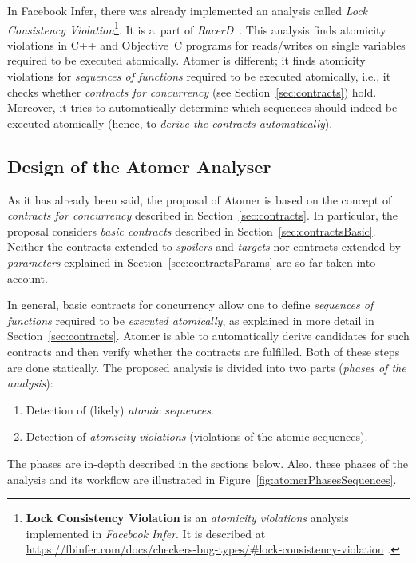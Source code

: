 In Facebook Infer, there was already implemented an analysis called \emph{Lock
Consistency Violation}\footnote{\textbf{Lock Consistency Violation} is an
\emph{atomicity violations} analysis implemented in \emph{Facebook Infer}. It
is described at
\url{https://fbinfer.com/docs/checkers-bug-types/\#lock-consistency-violation}%
.}. It is a~part of \emph{RacerD}~\cite{racerD, staticRaceDetectorTruePositives,
racerDOnline}. This analysis finds atomicity violations in C++ and Objective~C
programs for reads/writes on single variables required to be executed
atomically. Atomer is different; it finds atomicity violations for
\emph{sequences of functions} required to be executed atomically, i.e., it
checks whether \emph{contracts for concurrency}
(see Section~\ref{sec:contracts}) hold. Moreover, it tries to automatically
determine which sequences should indeed be executed atomically (hence, to
\emph{derive the contracts automatically}).

\subsection{Design of the Atomer Analyser}

As it has already been said, the proposal of Atomer is based on the concept
of \emph{contracts for concurrency} described in Section~\ref{sec:contracts}.
In particular, the proposal considers \emph{basic contracts} described in
Section~\ref{sec:contractsBasic}. Neither the contracts extended to
\emph{spoilers} and \emph{targets}
nor contracts extended by \emph{parameters} explained in
Section~\ref{sec:contractsParams} are so far taken into account.

In general, basic contracts for concurrency allow one to define \emph{sequences
of functions} required to be \emph{executed atomically}, as explained in more
detail in Section~\ref{sec:contracts}. Atomer is able to automatically derive
candidates for such contracts and then verify whether the contracts are
fulfilled. Both of these steps are done statically. The proposed analysis is
divided into two parts (\emph{phases of the analysis}):
\begin{enumerate}[label={\textbf{Phase~\arabic*}:}, leftmargin=5em]
    \item
        Detection of (likely) \emph{atomic sequences}.

    \item
        Detection of \emph{atomicity violations} (violations of the atomic
        sequences).
\end{enumerate}
The phases are in-depth described in the sections below. Also, these phases of
the analysis and its workflow are illustrated in
Figure~\ref{fig:atomerPhasesSequences}.

